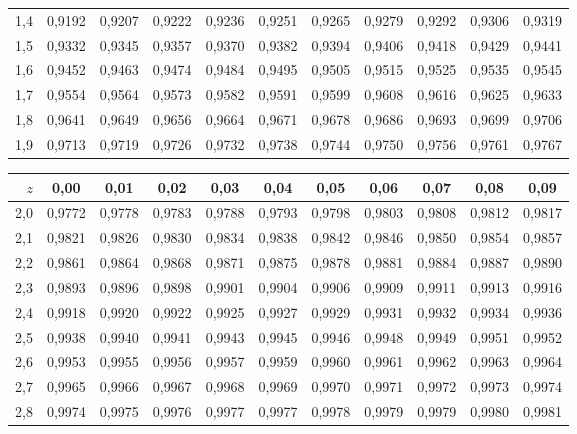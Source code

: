 \begin{center}
\begin{tabular}{@{}r|cccccccccc@{}}
1{,}4 & 0{,}9192 & 0{,}9207 & 0{,}9222 & 0{,}9236 & 0{,}9251 & 0{,}9265 & 0{,}9279 & 0{,}9292 & 0{,}9306 & 0{,}9319 \\
1{,}5 & 0{,}9332 & 0{,}9345 & 0{,}9357 & 0{,}9370 & 0{,}9382 & 0{,}9394 & 0{,}9406 & 0{,}9418 & 0{,}9429 & 0{,}9441 \\
1{,}6 & 0{,}9452 & 0{,}9463 & 0{,}9474 & 0{,}9484 & 0{,}9495 & 0{,}9505 & 0{,}9515 & 0{,}9525 & 0{,}9535 & 0{,}9545 \\
1{,}7 & 0{,}9554 & 0{,}9564 & 0{,}9573 & 0{,}9582 & 0{,}9591 & 0{,}9599 & 0{,}9608 & 0{,}9616 & 0{,}9625 & 0{,}9633 \\
1{,}8 & 0{,}9641 & 0{,}9649 & 0{,}9656 & 0{,}9664 & 0{,}9671 & 0{,}9678 & 0{,}9686 & 0{,}9693 & 0{,}9699 & 0{,}9706 \\
1{,}9 & 0{,}9713 & 0{,}9719 & 0{,}9726 & 0{,}9732 & 0{,}9738 & 0{,}9744 & 0{,}9750 & 0{,}9756 & 0{,}9761 & 0{,}9767 \\
\bottomrule
\end{tabular}
\hspace{2.2em}
\begin{tabular}{@{}r|cccccccccc@{}}
\toprule
$z$ & 0{,}00 & 0{,}01 & 0{,}02 & 0{,}03 & 0{,}04 & 0{,}05 & 0{,}06 & 0{,}07 & 0{,}08 & 0{,}09 \\
\midrule
2{,}0 & 0{,}9772 & 0{,}9778 & 0{,}9783 & 0{,}9788 & 0{,}9793 & 0{,}9798 & 0{,}9803 & 0{,}9808 & 0{,}9812 & 0{,}9817 \\
2{,}1 & 0{,}9821 & 0{,}9826 & 0{,}9830 & 0{,}9834 & 0{,}9838 & 0{,}9842 & 0{,}9846 & 0{,}9850 & 0{,}9854 & 0{,}9857 \\
2{,}2 & 0{,}9861 & 0{,}9864 & 0{,}9868 & 0{,}9871 & 0{,}9875 & 0{,}9878 & 0{,}9881 & 0{,}9884 & 0{,}9887 & 0{,}9890 \\
2{,}3 & 0{,}9893 & 0{,}9896 & 0{,}9898 & 0{,}9901 & 0{,}9904 & 0{,}9906 & 0{,}9909 & 0{,}9911 & 0{,}9913 & 0{,}9916 \\
2{,}4 & 0{,}9918 & 0{,}9920 & 0{,}9922 & 0{,}9925 & 0{,}9927 & 0{,}9929 & 0{,}9931 & 0{,}9932 & 0{,}9934 & 0{,}9936 \\
2{,}5 & 0{,}9938 & 0{,}9940 & 0{,}9941 & 0{,}9943 & 0{,}9945 & 0{,}9946 & 0{,}9948 & 0{,}9949 & 0{,}9951 & 0{,}9952 \\
2{,}6 & 0{,}9953 & 0{,}9955 & 0{,}9956 & 0{,}9957 & 0{,}9959 & 0{,}9960 & 0{,}9961 & 0{,}9962 & 0{,}9963 & 0{,}9964 \\
2{,}7 & 0{,}9965 & 0{,}9966 & 0{,}9967 & 0{,}9968 & 0{,}9969 & 0{,}9970 & 0{,}9971 & 0{,}9972 & 0{,}9973 & 0{,}9974 \\
2{,}8 & 0{,}9974 & 0{,}9975 & 0{,}9976 & 0{,}9977 & 0{,}9977 & 0{,}9978 & 0{,}9979 & 0{,}9979 & 0{,}9980 & 0{,}9981 \\

\end{tabular}
\end{center}
